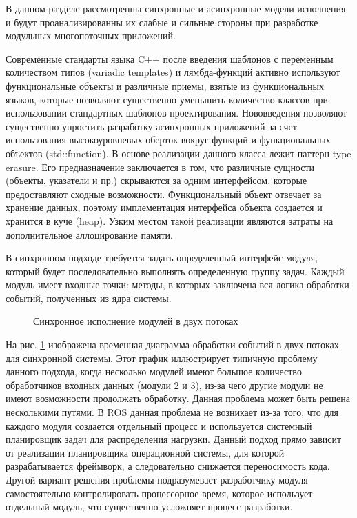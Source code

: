 В данном разделе рассмотренны синхронные и асинхронные модели исполнения и будут проанализированны их слабые и сильные стороны при разработке модульных многопоточных приложений.

Современные стандарты языка C++ после введения шаблонов с переменным количеством типов (variadic templates) и лямбда-функций активно используют функциональные объекты и различные приемы, взятые из функциональных языков, которые позволяют существенно уменьшить количество классов при использовании стандартных шаблонов проектирования. Нововведения позволяют существенно упростить разработку асинхронных приложений за счет использования высокоуровневых оберток вокруг функций и функциональных объектов (std::function). В основе реализации данного класса лежит паттерн type erasure. Его предназначение заключается в том, что различные сущности (объекты, указатели и пр.) скрываются за одним интерфейсом, которые предоставляют сходные возможности. Функциональный объект отвечает за хранение данных, поэтому имплементация интерфейса объекта создается и хранится в куче (heap). Узким местом такой реализации являются затраты на дополнительное аллоцирование памяти.


В синхронном подходе требуется задать определенный интерфейс модуля, который будет последовательно выполнять определенную группу задач. Каждый модуль имеет входные точки: методы, в которых заключена вся логика обработки событий, полученных из ядра системы.

\begin{figure}[h]
    \caption{Синхронное исполнение модулей в двух потоках}
    \label{im:2_1_1_sync}
\end{figure}

На рис. \ref{im:2_1_1_sync} изображена временная диаграмма обработки событий в двух потоках для синхронной системы. Этот график иллюстрирует типичную проблему данного подхода, когда несколько модулей имеют большое количество обработчиков входных данных (модули 2 и 3), из-за чего другие модули не имеют возможности продолжать обработку. Данная проблема может быть решена несколькими путями. В ROS данная проблема не возникает из-за того, что для каждого модуля создается отдельный процесс и используется системный планировщик задач для распределения нагрузки. Данный подход прямо зависит от реализации планировщика операционной системы, для которой разрабатывается фреймворк, а следовательно снижается переносимость кода. Другой вариант решения проблемы подразумевает разработчику модуля самостоятельно контролировать процессорное время, которое использует отдельный модуль, что существенно усложняет процесс разработки.

